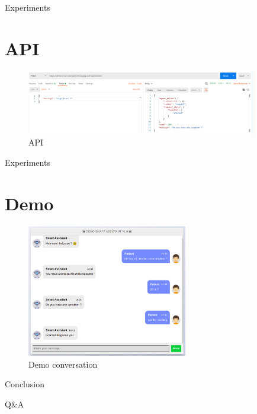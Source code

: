 \documentclass[10pt]{beamer}
\begin{document}
\begin{frame}{Experiments}
    \section{API}
    \begin{figure}[H]
    \centering
    \includegraphics[width=10cm]{image/call_api.png}
    \caption{API}
    \label{fig:api}
    \end{figure}
\end{frame}

\begin{frame}{Experiments}
    \section{Demo}
    \begin{figure}[H]
    \centering
    \includegraphics[width=7cm]{image/demo_smart_assistant.png}
    \caption{Demo conversation}
    \label{fig:demo}
    \end{figure}
\end{frame}

\begin{frame}{Conclusion}
    \begin{center}
        Q\&A
    \end{center}
\end{frame}
\end{document}

